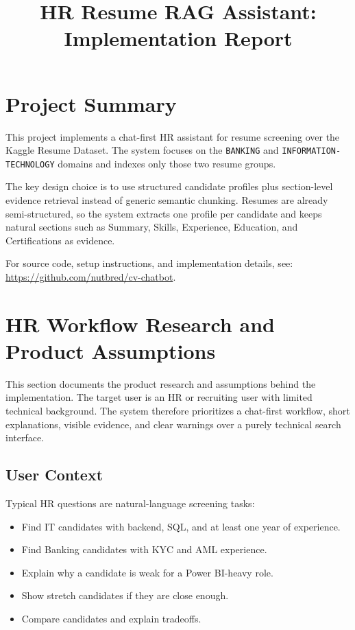 \documentclass[11pt]{article}
\title{HR Resume RAG Assistant: Implementation Report}
\author{}
\date{}
\begin{document}
\maketitle

\section{Project Summary}

This project implements a chat-first HR assistant for resume screening over the Kaggle Resume Dataset. The system focuses on the \texttt{BANKING} and \texttt{INFORMATION-TECHNOLOGY} domains and indexes only those two resume groups.

The key design choice is to use structured candidate profiles plus section-level evidence retrieval instead of generic semantic chunking. Resumes are already semi-structured, so the system extracts one profile per candidate and keeps natural sections such as Summary, Skills, Experience, Education, and Certifications as evidence.

For source code, setup instructions, and implementation details, see: \url{https://github.com/nutbred/cv-chatbot}.

\section{HR Workflow Research and Product Assumptions}

This section documents the product research and assumptions behind the implementation. The target user is an HR or recruiting user with limited technical background. The system therefore prioritizes a chat-first workflow, short explanations, visible evidence, and clear warnings over a purely technical search interface.

\subsection{User Context}

Typical HR questions are natural-language screening tasks:

\begin{itemize}[leftmargin=*]
  \item Find IT candidates with backend, SQL, and at least one year of experience.
  \item Find Banking candidates with KYC and AML experience.
  \item Explain why a candidate is weak for a Power BI-heavy role.
  \item Show stretch candidates if they are close enough.
  \item Compare candidates and explain tradeoffs.
\end{itemize}
\end{document}
